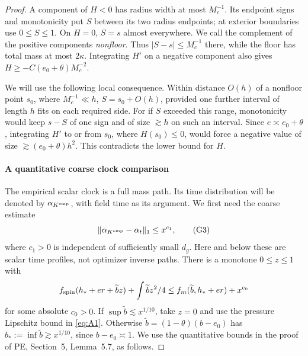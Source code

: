 \begin{proof}
A component of \(H<0\) has radius width at most \(M_c^{-1}\).
Its endpoint signs and monotonicity put \(S\) between its two radius
endpoints; at exterior boundaries use \(0\le S\le1\). On \(H=0\),
\(S=s\) almost everywhere. We call the complement of the positive
components \emph{nonfloor}. Thus \(|S-s|\le M_c^{-1}\) there, while
the floor has total mass at most \(2\kappa\). Integrating \(H'\) on
a negative component also gives \(H\ge-C(e_0+\theta)M_c^{-2}\).

We will use the following local consequence. Within distance \(O(h)\)
of a nonfloor point \(s_0\), where \(M_c^{-1}\ll h\),
\(S=s_0+O(h)\), provided one further interval of length \(h\) fits
on each required side. For if \(S\) exceeded this range, monotonicity
would keep \(s-S\) of one sign and of size \(\gtrsim h\) on such
an interval. Since \(e\asymp e_0+\theta\), integrating \(H'\) to
or from \(s_0\), where \(H(s_0)\le0\), would force a negative
value of size \(\gtrsim(e_0+\theta)h^2\). This contradicts the
lower bound for \(H\).

\paragraph{A quantitative coarse clock comparison}
The empirical scalar clock is a full mass path. Its time distribution
will be denoted by \(\alpha_{K^{\rm emp}}\), with field time as its
argument. We first need the coarse estimate
\[
 \|\alpha_{K^{\rm emp}}-\alpha_t\|_1\le x^{c_1},                         \tag{G3}\label{eq:G3}
\]
where \(c_1>0\) is independent of sufficiently small \(d_g\). Here and below these are scalar time profiles, not optimizer inverse paths. There is a monotone \(0\le z\le1\) with
\[
 f_{\rm spin}(h_*+e r+\widetilde b z)+\int\widetilde b z^2/4
       \le f_m(\widetilde b,h_*+e r)+x^{c_0}
\]
for some absolute \(c_0>0\). If \(\sup\widetilde b\lesssim x^{1/10}\),
take \(z=0\) and use the pressure Lipschitz bound in \eqref{eq:A1}.
Otherwise \(\widetilde b=(1-\theta)(b-e_0)\) has
\(b_*:=\inf\widetilde b\gtrsim x^{1/10}\), since \(b-e_0\asymp1\).
We use the quantitative bounds in the proof of PE, Section~5,
Lemma~5.7, as follows.


\end{proof}
